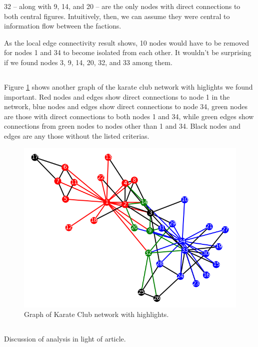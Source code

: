 \documentclass[11pt]{article}
\begin{document}
32 -- along with 9, 14, and 20 -- are the only nodes with direct connections to both
central figures. Intuitively, then, we can assume they were central to information flow
between the factions.

As the local edge connectivity result shows, 10 nodes would have to be removed for
nodes 1 and 34 to become isolated from each other. It wouldn't be surprising if we
found nodes 3, 9, 14, 20, 32, and 33 among them.

\subsection{}
Figure \ref{fig:graph model2} shows another graph of the karate club network with
higlights we found important. Red nodes and edges show direct connections to node 1
in the network, blue nodes and edges show direct connections to node 34, green nodes
are those with direct connections to both nodes 1 and 34, while green edges show
connections from green nodes to nodes other than 1 and 34. Black nodes and edges are
any those without the listed criterias.

\begin{figure}
  \includegraphics[width=\linewidth]{Figure_2.png}
  \caption{Graph of Karate Club network with highlights.}
  \label{fig:graph model2}
\end{figure}

\subsection{}
Discussion of analysis in light of article.
\end{document}
